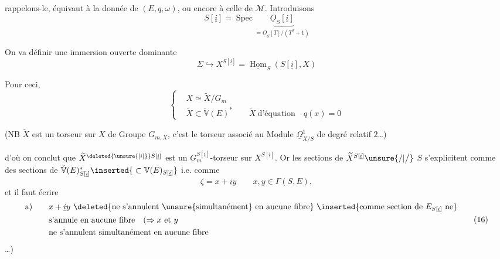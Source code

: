 rappelons-le, équivaut à la donnée de $(E,q,\omega)$, ou encore à celle de $\mathcal M$. Introduisons
\[
S[\underline i]=\operatorname{Spec}\underbrace{\underline O_S[\underline i]}_{=\underline O_S[T]/(T^2+1)}\tag*{(13)}
\]

On va définir une immersion ouverte dominante
\[
\Sigma\hookrightarrow X^{S[\underline i]}=\underline{\operatorname{Hom}}_S(S[\underline i],X)\tag*{(14)}
\]

Pour ceci,  
\[
\left\{\begin{aligned}&X\simeq\widetilde X/G_m\\&\widetilde X\subset\check{\mathbb V}(E)^*\qquad\widetilde X\ \text{d'équation}\quad q(x)=0\end{aligned}\right.\tag*{(15)}
\]

(NB $\widetilde X$ est un torseur sur $X$ de Groupe $G_{m,X}$, c'est le torseur associé au Module $\underline\Omega^1_{X/S}$ de degré relatif $2$\ldots)

 d'où on conclut que $\widetilde X^{\deleted{\unsure{[i]}}S[\underline i]}$ est un $G_m^{S[\underline i]}$-torseur sur $X^{S[\underline i]}$. Or les sections \inserted{$\unsure{\zeta|\xi}$} de
$\widetilde X^{S[\underline i]}\unsure{/|\big/}$  $S$ s'explicitent comme des sections de $\check{\mathbb V}(E)^*_{S[\underline i]}\inserted{{}\subset\mathbb V(E)_{S[\underline i]}}$ i.e.  comme
\[
\zeta=x+\underline i y\qquad x,y\in\Gamma(S,E),
\]
et il faut écrire
\[
\begin{aligned}\text{a)}\qquad &x+\underline i y\ \deleted{\text{ne s'annulent \unsure{simultanément} en aucune fibre}}\ \inserted{\text{comme section de }E_{S[\underline i]}\text{ ne}}\\&\text{s'annule en aucune fibre}\quad(\Rightarrow x\ \text{et }y\\&\text{ne s'annulent simultanément en aucune fibre}\end{aligned}\tag*{(16)}
\]
\ldots)
